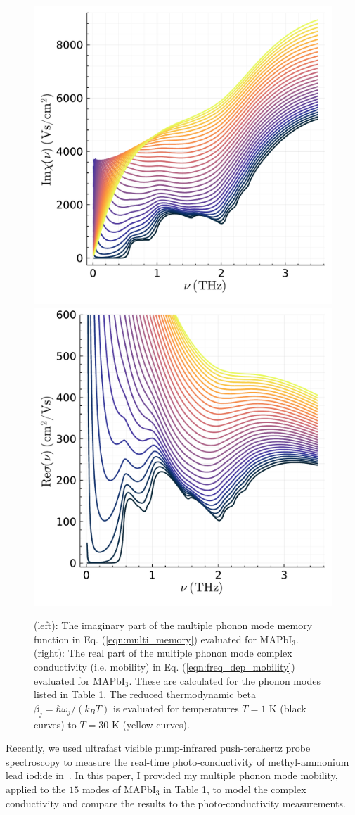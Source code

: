 \begin{figure}[t]
    \centering
    \includegraphics[width=.49\textwidth]{figures/zero_mem.pdf}
    \includegraphics[width=.49\textwidth]{figures/zero_conduct.pdf}
    
    \caption{(left): The imaginary part of the multiple phonon mode memory function in Eq. (\ref{eqn:multi_memory}) evaluated for MAPbI$_3$. (right): The real part of the multiple phonon mode complex conductivity (i.e. mobility) in Eq. (\ref{eqn:freq_dep_mobility}) evaluated for MAPbI$_3$. These are calculated for the phonon modes listed in Table 1. The reduced thermodynamic beta $\beta_j = \hbar \omega_j / (k_B T)$ is evaluated for temperatures $T = 1$ K (black curves) to $T = 30$ K (yellow curves).}
    \label{fig:athermal_thz}
\end{figure}

Recently, we used ultrafast visible pump-infrared push-terahertz probe spectroscopy to measure the real-time photo-conductivity of methyl-ammonium lead iodide in~\cite{zheng_multipulse_2021}. In this paper, I provided my multiple phonon mode mobility, applied to the $15$ modes of MAPbI$_3$ in Table 1, to model the complex conductivity and compare the results to the photo-conductivity measurements. 

